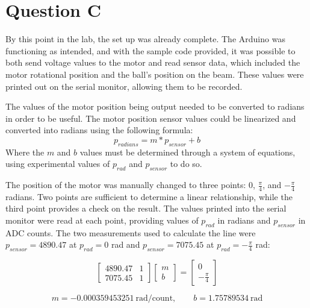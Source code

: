 \documentclass[11pt, letterpaper]{article}
\begin{document}
\section{Question C}
By this point in the lab, the set up was already complete. The Arduino was functioning as
intended, and with the sample code provided, it was possible to both send voltage values to
the motor and read sensor data, which included the motor rotational position and the ball's
position on the beam. These values were printed out on the serial monitor, allowing
them to be recorded.\par
The values of the motor position being output needed to be converted to radians in order
to be useful. The motor position sensor values could be linearized and converted into radians using the following formula:
\begin{equation}
    p_{radians} = m * p_{sensor} + b
\end{equation}
Where the $m$ and $b$ values must be determined through a system of equations, using
experimental values of $p_{rad}$ and $p_{sensor}$ to do so. \par
The position of the motor was manually changed to three points: $0$, $\frac{\pi}{4}$,
and $-\frac{\pi}{4}$ radians. Two points are sufficient to determine a linear
relationship, while the third point provides a check on the result. The values
printed into the serial monitor were read at each point, providing values of
$p_{rad}$ in radians and $p_{sensor}$ in ADC counts. The two measurements used
to calculate the line were $p_{sensor}=4890.47$ at $p_{rad}=0$ rad and
$p_{sensor}=7075.45$ at $p_{rad}=-\frac{\pi}{4}$ rad:

\begin{equation}
    \begin{bmatrix}
        4890.47 & 1 \\
        7075.45 & 1
    \end{bmatrix}
    \begin{bmatrix}
        m \\
        b
    \end{bmatrix}
    =
    \begin{bmatrix}
        0 \\
        -\frac{\pi}{4}
    \end{bmatrix}
\end{equation}


\begin{equation}
    m = -0.000359453251 \ \mathrm{rad/count}, \qquad
    b = 1.75789534 \ \mathrm{rad}
\end{equation}
\end{document}
